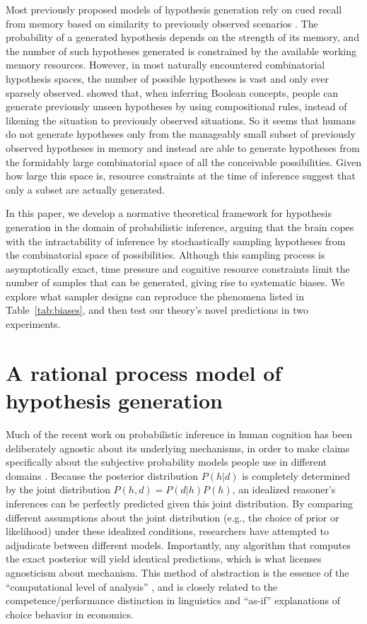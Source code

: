 Most previously proposed models of hypothesis generation rely on cued recall from memory based on similarity to previously observed scenarios \citep[c.f.][]{Thomas2008}. The probability of a generated hypothesis depends on the strength of its memory, and the number of such hypotheses generated is constrained by the available working memory resources. However, in most naturally encountered combinatorial hypothesis spaces, the number of possible hypotheses is vast and only ever sparsely observed. \cite{Goodman2008} showed that, when inferring Boolean concepts, people can generate previously unseen hypotheses by using compositional rules, instead of likening the situation to previously observed situations. So it seems that humans do not generate hypotheses only from the manageably small subset of previously observed hypotheses in memory and instead are able to generate hypotheses from the formidably large combinatorial space of all the conceivable possibilities. Given how large this space is, resource constraints at the time of inference suggest that only a subset are actually generated.

In this paper, we develop a normative theoretical framework for hypothesis generation in the domain of probabilistic inference, arguing that the brain copes with the intractability of inference by stochastically sampling hypotheses from the combinatorial space of possibilities. Although this sampling process is asymptotically exact, time pressure and cognitive resource constraints limit the number of samples that can be generated, giving rise to systematic biases. We explore what sampler designs can reproduce the phenomena listed in Table~\ref{tab:biases}, and then test our theory's novel predictions in two experiments.

\section{A rational process model of hypothesis generation}

Much of the recent work on probabilistic inference in human cognition has been deliberately agnostic about its underlying mechanisms, in order to make claims specifically about the subjective probability models people use in different domains \citep{chater2006}. Because the posterior distribution $P(h|d)$ is completely determined by the joint distribution $P(h,d) = P(d|h)P(h)$, an idealized reasoner's inferences can be perfectly predicted given this joint distribution. By comparing different assumptions about the joint distribution (e.g., the choice of prior or likelihood) under these idealized conditions, researchers have attempted to adjudicate between different models. Importantly, any algorithm that computes the exact posterior will yield identical predictions, which is what licenses agnosticism about mechanism. This method of abstraction is the essence of the ``computational level of analysis'' \citep{marr1976understanding}, and is closely related to the competence/performance distinction in linguistics and ``as-if'' explanations of choice behavior in economics.

